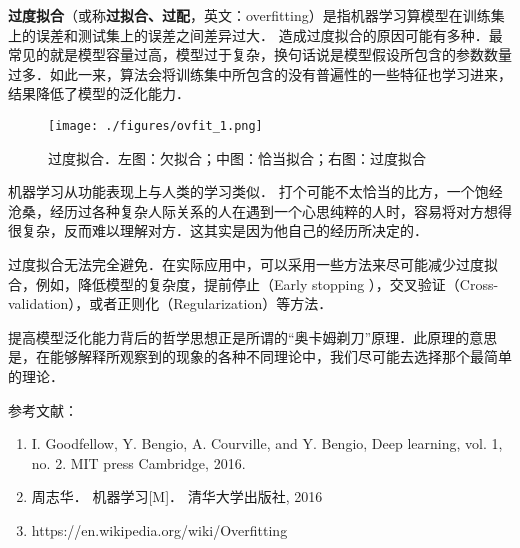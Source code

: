 
\textbf{过度拟合}（或称\textbf{过拟合、过配}，英文：overfitting）是指机器学习算模型在训练集上的误差和测试集上的误差之间差异过大．
造成过度拟合的原因可能有多种．最常见的就是模型容量过高，模型过于复杂，换句话说是模型假设所包含的参数数量过多．如此一来，算法会将训练集中所包含的没有普遍性的一些特征也学习进来，结果降低了模型的泛化能力．

\begin{figure}[ht]
\centering
\texttt{[image: ./figures/ovfit\_1.png]}
\caption{过度拟合．左图：欠拟合；中图：恰当拟合；右图：过度拟合} \label{ovfit_fig1}
\end{figure}

机器学习从功能表现上与人类的学习类似．
打个可能不太恰当的比方，一个饱经沧桑，经历过各种复杂人际关系的人在遇到一个心思纯粹的人时，容易将对方想得很复杂，反而难以理解对方．这其实是因为他自己的经历所决定的．

过度拟合无法完全避免．在实际应用中，可以采用一些方法来尽可能减少过度拟合，例如，降低模型的复杂度，提前停止（Early stopping
），交叉验证（Cross-validation），或者正则化（Regularization）等方法．

提高模型泛化能力背后的哲学思想正是所谓的“奥卡姆剃刀”原理．此原理的意思是，在能够解释所观察到的现象的各种不同理论中，我们尽可能去选择那个最简单的理论．



参考文献：
\begin{enumerate}
\item I. Goodfellow, Y. Bengio, A. Courville, and Y. Bengio, Deep learning, vol. 1, no. 2. MIT press Cambridge, 2016.
\item 周志华． 机器学习[M]． 清华大学出版社, 2016
\item https://en.wikipedia.org/wiki/Overfitting
\end{enumerate}